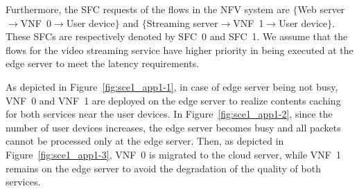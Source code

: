 \documentclass[technicalreport]{ieicej}
\begin{document}
	Furthermore, the SFC requests of the flows in the NFV system are $\{$Web server$\rightarrow$VNF~0$\rightarrow$User device$\}$ and $\{$Streaming server$\rightarrow$VNF~1$\rightarrow$User device$\}$.
	These SFCs are respectively denoted by SFC~0 and SFC~1.
	We assume that the flows for the video streaming service have higher priority in being executed at the edge server to meet the latency requirements.

	As depicted in Figure~\ref{fig:sce1_app1-1}, in case of edge server being not busy, VNF~0 and VNF~1 are deployed on the edge server to realize contents caching for both services near the user devices.
	In Figure~\ref{fig:sce1_app1-2}, since the number of user devices increases, the edge server becomes busy and all packets cannot be processed only at the edge server.
	Then, as depicted in Figure~\ref{fig:sce1_app1-3}, VNF~0 is migrated to the cloud server, while VNF~1 remains on the edge server to avoid the degradation of the quality of both services.
\end{document}
